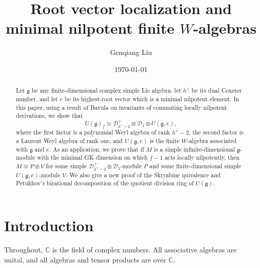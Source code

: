 \documentclass[12pt,a4paper]{amsart}
\title[Highest-root localization: a centralizer proof]
{Root vector localization and minimal nilpotent finite \(W\)-algebras}
\author{Genqiang Liu}
\date{\today}
\numberwithin{equation}{section}
\theoremstyle{definition}
\theoremstyle{remark}
\newcommand{\C}{\mathbb{C}}
\begin{document}
\begin{abstract}
Let \(\mathfrak{g}\) be any finite-dimensional complex simple Lie algebra, let $h^\vee$ be its dual Coxeter number, and let \(e\) be
its highest-root vector which is a minimal nilpotent element. In this paper, using a result of Bavula  on
invariants of commuting locally nilpotent derivations, we  show that
\[
 U(\mathfrak{g})_f
 \cong \mathcal{D}^+_{h^\vee-2}\otimes \mathcal{D}_1\otimes U(\mathfrak{g},e),
\]
 where
 the first factor is a  polynomial Weyl algebra of rank $h^\vee-2$, the second factor is a Laurent Weyl algebra of rank one, and  $U(\mathfrak{g},e)$ is the finite $W$-algebra associated with $\mathfrak{g}$ and $e$. As an application, we prove that if $M$ is a simple  infinite-dimensional   $\mathfrak{g}$-module with the minimal GK dimension  on which
 $f-1$ acts locally nilpotently,  then $M\cong P\otimes V$
 for some simple $\mathcal{D}^+_{h^\vee-2}\otimes \mathcal{D}_1$-module $P$ and some finite-dimensional simple  $U(\mathfrak{g},e)$-module $V$. We also give a new proof of the Skryabine quivalence and  Petukhov's birational decomposition of the quotient division ring  of $U(\mathfrak{g})$.
\end{abstract}

\maketitle
\begingroup
\footnotesize
\vspace*{-1.5\baselineskip}
\endgroup

\section{Introduction}

Throughout, \(\C\) is the field of
complex numbers. All associative algebras are unital, and all algebras and
tensor products are over \(\C\).
\end{document}
